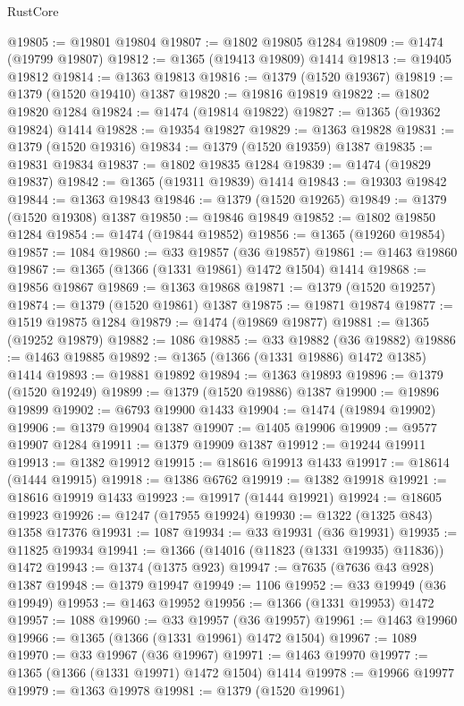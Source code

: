 \begin{lexlean}{RustCore}
\begin{coremodule}
@19805 := @19801 @19804
@19807 := @1802 @19805 @1284
@19809 := @1474 (@19799 @19807)
@19812 := @1365 (@19413 @19809) @1414
@19813 := @19405 @19812
@19814 := @1363 @19813
@19816 := @1379 (@1520 @19367)
@19819 := @1379 (@1520 @19410) @1387
@19820 := @19816 @19819
@19822 := @1802 @19820 @1284
@19824 := @1474 (@19814 @19822)
@19827 := @1365 (@19362 @19824) @1414
@19828 := @19354 @19827
@19829 := @1363 @19828
@19831 := @1379 (@1520 @19316)
@19834 := @1379 (@1520 @19359) @1387
@19835 := @19831 @19834
@19837 := @1802 @19835 @1284
@19839 := @1474 (@19829 @19837)
@19842 := @1365 (@19311 @19839) @1414
@19843 := @19303 @19842
@19844 := @1363 @19843
@19846 := @1379 (@1520 @19265)
@19849 := @1379 (@1520 @19308) @1387
@19850 := @19846 @19849
@19852 := @1802 @19850 @1284
@19854 := @1474 (@19844 @19852)
@19856 := @1365 (@19260 @19854)
@19857 := 1084
@19860 := @33 @19857 (@36 @19857)
@19861 := @1463 @19860
@19867 := @1365 (@1366 (@1331 @19861) @1472 @1504) @1414
@19868 := @19856 @19867
@19869 := @1363 @19868
@19871 := @1379 (@1520 @19257)
@19874 := @1379 (@1520 @19861) @1387
@19875 := @19871 @19874
@19877 := @1519 @19875 @1284
@19879 := @1474 (@19869 @19877)
@19881 := @1365 (@19252 @19879)
@19882 := 1086
@19885 := @33 @19882 (@36 @19882)
@19886 := @1463 @19885
@19892 := @1365 (@1366 (@1331 @19886) @1472 @1385) @1414
@19893 := @19881 @19892
@19894 := @1363 @19893
@19896 := @1379 (@1520 @19249)
@19899 := @1379 (@1520 @19886) @1387
@19900 := @19896 @19899
@19902 := @6793 @19900 @1433
@19904 := @1474 (@19894 @19902)
@19906 := @1379 @19904 @1387
@19907 := @1405 @19906
@19909 := @9577 @19907 @1284
@19911 := @1379 @19909 @1387
@19912 := @19244 @19911
@19913 := @1382 @19912
@19915 := @18616 @19913 @1433
@19917 := @18614 (@1444 @19915)
@19918 := @1386 @6762
@19919 := @1382 @19918
@19921 := @18616 @19919 @1433
@19923 := @19917 (@1444 @19921)
@19924 := @18605 @19923
@19926 := @1247 (@17955 @19924)
@19930 := @1322 (@1325 @843) @1358 @17376
@19931 := 1087
@19934 := @33 @19931 (@36 @19931)
@19935 := @11825 @19934
@19941 := @1366 (@14016 (@11823 (@1331 @19935) @11836)) @1472
@19943 := @1374 (@1375 @923)
@19947 := @7635 (@7636 @43 @928) @1387
@19948 := @1379 @19947
@19949 := 1106
@19952 := @33 @19949 (@36 @19949)
@19953 := @1463 @19952
@19956 := @1366 (@1331 @19953) @1472
@19957 := 1088
@19960 := @33 @19957 (@36 @19957)
@19961 := @1463 @19960
@19966 := @1365 (@1366 (@1331 @19961) @1472 @1504)
@19967 := 1089
@19970 := @33 @19967 (@36 @19967)
@19971 := @1463 @19970
@19977 := @1365 (@1366 (@1331 @19971) @1472 @1504) @1414
@19978 := @19966 @19977
@19979 := @1363 @19978
@19981 := @1379 (@1520 @19961)

\end{coremodule}
\end{lexlean}
